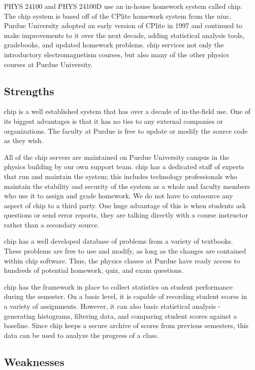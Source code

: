 PHYS 24100 and PHYS 24100D use an in-house homework system called \gls{chip}. The \gls{chip} system is based off of the CPlite homework system from the \gls{uiuc}. Purdue University adopted an early version of CPlite in 1997 and continued to make improvements to it over the next decade, adding statistical analysis tools, gradebooks, and updated homework problems. \gls{chip} services not only the introductory electromagnetism courses, but also many of the other physics courses at Purdue University.

\subsection*{Strengths}

\gls{chip} is a well established system that has over a decade of in-the-field use. One of its biggest advantages is that it has no ties to any external companies or organizations. The faculty at Purdue is free to update or modify the source code as they wish.

All of the \gls{chip} servers are maintained on Purdue University campus in the physics building by our own support team. \gls{chip} has a dedicated staff of experts that run and maintain the system; this includes technology professionals who maintain the stability and security of the system as a whole and faculty members who use it to assign and grade homework. We do not have to outsource any aspect of \gls{chip} to a third party. One huge advantage of this is when students ask questions or send error reports, they are talking directly with a course instructor rather than a secondary source.

\gls{chip} has a well developed database of problems from a variety of textbooks. These problems are free to use and modify, as long as the changes are contained within \gls{chip} software. Thus, the physics classes at Purdue have ready access to hundreds of potential homework, quiz, and exam questions.

\gls{chip} has the framework in place to collect statistics on student performance during the semester. On a basic level, it is capable of recording student scores in a variety of assignments. However, it can also basic statistical analysis - generating histograms, filtering data, and comparing student scores against a baseline. Since \gls{chip} keeps a secure archive of scores from previous semesters, this data can be used to analyze the progress of a class.

\subsection*{Weaknesses}


